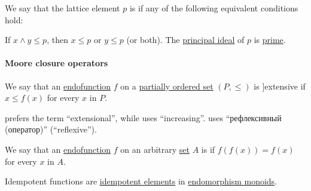 \begin{definition}\label{def:lattice_prime_element}
  We say that the lattice element \( p \) is  if any of the following equivalent conditions hold:
  \begin{thmenum}
     If \( x \wedge y \leq p \), then \( x \leq p \) or \( y \leq p \) (or both).
     The \hyperref[def:lattice_ideal/principal]{principal ideal} of \( p \) is \hyperref[def:lattice_ideal/prime]{prime}.
  \end{thmenum}
\end{definition}

\paragraph{Moore closure operators}

\begin{definition}\label{def:extensive_function}
  We say that an \hyperref[def:function/endofunction]{endofunction} \( f \) on a \hyperref[def:partially_ordered_set]{partially ordered set} \( (P, \leq) \) is \term[en=extensive \cite[111]{Birkhoff1967}]{extensive} if \( x \leq f(x) \) for every \( x \) in \( P \).
\end{definition}
\begin{comments}
  \item {} prefers the term \enquote{extensional}, while  uses \enquote{increasing}.  uses \enquote{рефлексивный (оператор)} (\enquote{reflexive}).
\end{comments}

\begin{definition}\label{def:idempotent_function}
  We say that an \hyperref[def:function/endofunction]{endofunction} \( f \) on an arbitrary \hyperref[def:set]{set} \( A \) is  if \( f(f(x)) = f(x) \) for every \( x \) in \( A \).
\end{definition}
\begin{comments}
  \item Idempotent functions are \hyperref[def:monoid_idempotent]{idempotent elements} in \hyperref[def:endomorphism_monoid]{endomorphism monoids}.
\end{comments}

